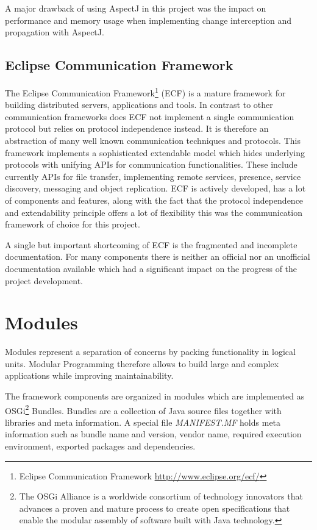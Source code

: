 A major drawback of using AspectJ in this project was the impact on
performance and memory usage when implementing change interception and
propagation with AspectJ.

\subsection{Eclipse Communication Framework}
The Eclipse Communication Framework\footnote{Eclipse Communication 
Framework \url{http://www.eclipse.org/ecf/}} (ECF) is a mature framework for 
building distributed servers, applications and tools. In contrast to 
other communication frameworks does ECF not implement a single 
communication protocol but relies on protocol independence instead. It 
is therefore an abstraction of many well known communication 
techniques and protocols. This framework implements a sophisticated 
extendable model which hides underlying protocols with unifying APIs 
for communication functionalities. These include currently APIs for
file transfer, implementing remote services, presence, service 
discovery, messaging and object replication. ECF is actively developed,
has a lot of components and features, along with the fact that the protocol
independence and extendability principle offers a lot of flexibility 
this was the communication framework of choice for this project.

A single but important shortcoming of ECF is the fragmented and 
incomplete documentation. For many components there is neither an official
nor an unofficial documentation available which had a significant 
impact on the progress of the project development.

\section{Modules}
Modules represent a separation of concerns by packing functionality in logical units. Modular
Programming therefore allows to build large and complex applications while improving
maintainability.

The framework components are organized in modules which are implemented
as OSGi\footnote{The OSGi Alliance is a worldwide consortium of technology innovators that
advances a proven and mature process to create open specifications that enable
the modular assembly of software built with Java technology.} Bundles.
Bundles are a collection of Java source files together with libraries and meta information.
A special file \emph{MANIFEST.MF} holds meta information such as bundle name and version,
vendor name, required execution environment, exported packages and dependencies.

